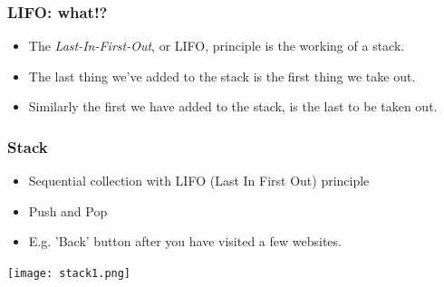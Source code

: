 \begin{frame}
	\frametitle{LIFO: what!?}
		\begin{itemize}
			\item The \textit{Last-In-First-Out}, or LIFO, principle is the working of a stack.
			\item The last thing we've added to the stack is the first thing we take out.
			\item Similarly the first we have added to the stack, is the last to be taken out.
		\end{itemize}	
\end{frame}

\begin{frame}
	\frametitle{Stack}
		\begin{itemize}
		\item Sequential collection with LIFO (Last In First Out) principle
		\item Push and Pop
		\item E.g. 'Back' button after you have visited a few websites.
		\end{itemize}
		
\begin{center}
\texttt{[image: stack1.png]}
\end{center}

\end{frame}


